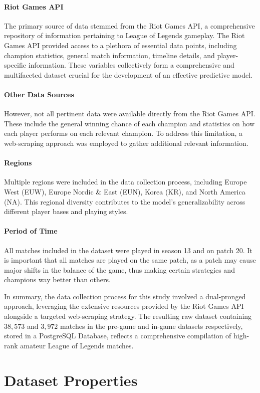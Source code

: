 \documentclass[12pt, a4paper, headinclude, twoside, plainheadsepline, open=right, numbers=noenddot, hidelinks, toc=listof, toc=bibliography]{scrreprt}
\begin{document}
\paragraph{Riot Games API}
The primary source of data stemmed from the Riot Games API, a comprehensive repository of information pertaining to League of Legends gameplay.
The Riot Games API provided access to a plethora of essential data points, including champion statistics, general match information, timeline details, and player-specific information.
These variables collectively form a comprehensive and multifaceted dataset crucial for the development of an effective predictive model.
\paragraph{Other Data Sources}
However, not all pertinent data were available directly from the Riot Games API.
These include the general winning chance of each champion and statistics on how each player performs on each relevant champion.
To address this limitation, a web-scraping approach was employed to gather additional relevant information. 
\paragraph{Regions}
Multiple regions were included in the data collection process, including Europe West (EUW), Europe Nordic \& East (EUN), Korea (KR), and North America (NA).
This regional diversity contributes to the model's generalizability across different player bases and playing styles.
\paragraph{Period of Time}
All matches included in the dataset were played in season 13 and on patch 20.
It is important that all matches are played on the same patch, as a patch may cause major shifts in the balance of the game, thus making certain strategies and champions way better than others.

In summary, the data collection process for this study involved a dual-pronged approach, leveraging the extensive resources provided by the Riot Games API alongside a targeted web-scraping strategy.
The resulting raw dataset containing $38,573$ and  $3,972$ matches in the pre-game and in-game datasets respectively, stored in a PostgreSQL Database, reflects a comprehensive compilation of high-rank amateur League of Legends matches.

\section{Dataset Properties}
\label{sec:dataprop}
\end{document}
